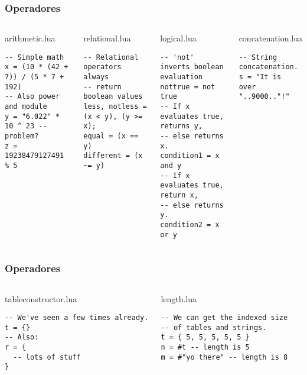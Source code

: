 \documentclass[brazil]{beamer}
\begin{document}

\begin{frame}[fragile]
  \frametitle{Operadores}
  \pause
  \begin{columns}
      \begin{block}{arithmetic.lua}
        \begin{lstlisting}
-- Simple math
x = (10 * (42 + 7)) / (5 * 7 + 192)
-- Also power and module
y = "6.022" * 10 ^ 23 -- problem?
z = 19238479127491 % 5
        \end{lstlisting}
      \end{block}
      \pause
      \begin{block}{relational.lua}
        \begin{lstlisting}
-- Relational operators always
-- return boolean values
less, notless = (x < y), (y >= x);
equal = (x == y)
different = (x ~= y)
        \end{lstlisting}
      \end{block}
    \pause
      \begin{block}{logical.lua}
        \begin{lstlisting}
-- 'not' inverts boolean evaluation
nottrue = not true
-- If x evaluates true, returns y,
-- else returns x.
condition1 = x and y
-- If x evaluates true, return x,
-- else returns y.
condition2 = x or y
        \end{lstlisting}
      \end{block}
      \pause
      \begin{block}{concatenation.lua}
        \begin{lstlisting}
-- String concatenation.
s = "It is over "..9000.."!"
        \end{lstlisting}
      \end{block}
  \end{columns}
\end{frame}


\begin{frame}[fragile]
  \frametitle{Operadores}
  \pause
  \begin{columns}
      \begin{block}{tableconstructor.lua}
        \begin{lstlisting}
-- We've seen a few times already.
t = {}
-- Also:
r = {
  -- lots of stuff
}
        \end{lstlisting}
      \end{block}
    \pause
      \begin{block}{length.lua}
        \begin{lstlisting}
-- We can get the indexed size
-- of tables and strings.
t = { 5, 5, 5, 5, 5 }
n = #t -- length is 5
m = #"yo there" -- length is 8
        \end{lstlisting}
      \end{block}
  \end{columns}
\end{frame}
\end{document}
